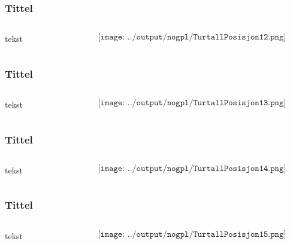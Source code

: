 \documentclass[aspectratio=169,xcolor=dvipsnames]{beamer}
\begin{document}
\begin{frame}
	\frametitle{Tittel}
	\begin{columns}
		\begin{column}{0.5\textwidth}
tekst
			
		\end{column}

		\begin{column}{0.5\textwidth}
	$$\texttt{[image: ../output/nogpl/TurtallPosisjon12.png]}$$
		\end{column}
	\end{columns}
\end{frame}

\begin{frame}
	\frametitle{Tittel}
	\begin{columns}
		\begin{column}{0.5\textwidth}
tekst
			
		\end{column}

		\begin{column}{0.5\textwidth}
	$$\texttt{[image: ../output/nogpl/TurtallPosisjon13.png]}$$
		\end{column}
	\end{columns}
\end{frame}

\begin{frame}
	\frametitle{Tittel}
	\begin{columns}
		\begin{column}{0.5\textwidth}
tekst
			
		\end{column}

		\begin{column}{0.5\textwidth}
	$$\texttt{[image: ../output/nogpl/TurtallPosisjon14.png]}$$
		\end{column}
	\end{columns}
\end{frame}

\begin{frame}
	\frametitle{Tittel}
	\begin{columns}
		\begin{column}{0.5\textwidth}
tekst
			
		\end{column}

		\begin{column}{0.5\textwidth}
	$$\texttt{[image: ../output/nogpl/TurtallPosisjon15.png]}$$
		\end{column}
	\end{columns}
\end{frame}
\end{document}
